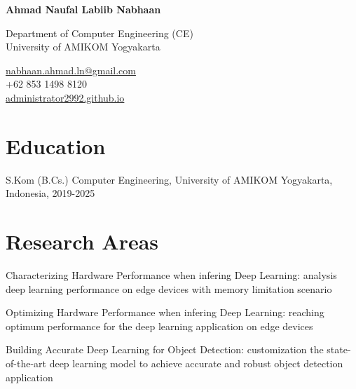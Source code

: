 \documentclass[12pt,letterpaper]{report}
\newcommand{\myname}{Ahmad Naufal Labiib Nabhaan}
\newcommand{\namefont}[1]{{\normalfont\bfseries\Huge{#1}}}
\newcommand{\listitemspace}{0.25em}
\renewenvironment{itemize}
{\begin{list}{}{\setlength{\leftmargin}{0em}
                \setlength{\parskip}{0em}
                \setlength{\itemsep}{\listitemspace}
                \setlength{\parsep}{\listitemspace}}}
{\end{list}}
\begin{document}
    \raggedright{}

    \namefont{\myname}

    \vspace{1em}
    \begin{minipage}[t]{0.700\textwidth}
        Department of Computer Engineering (CE)\\
        University of AMIKOM Yogyakarta
    \end{minipage}
    \begin{minipage}[t]{0.295\textwidth}
        \flushright{}
        \href{mailto:nabhaan.ahmad.ln@gmail.com}{nabhaan.ahmad.ln@gmail.com} \\
        +62 853 1498 8120 \\
        \href{https://administrator2992.github.io}{administrator2992.github.io}
    \end{minipage}

    \section*{Education}

    \begin{tablist}
        \item[S.Kom (B.Cs.)] \tab{}Computer Engineering, University of AMIKOM Yogyakarta, Indonesia, 2019-2025 \\
    \end{tablist}
    
    \section*{Research Areas}
    \begin{itemize}
      \item Characterizing Hardware Performance when infering Deep Learning: analysis deep learning performance on edge devices with memory limitation scenario
      \item Optimizing Hardware Performance when infering Deep Learning: reaching optimum performance for the deep learning application on edge devices
      \item Building Accurate Deep Learning for Object Detection: customization the state-of-the-art deep learning model to achieve accurate and robust object detection application
    \end{itemize}
    
\end{document}
